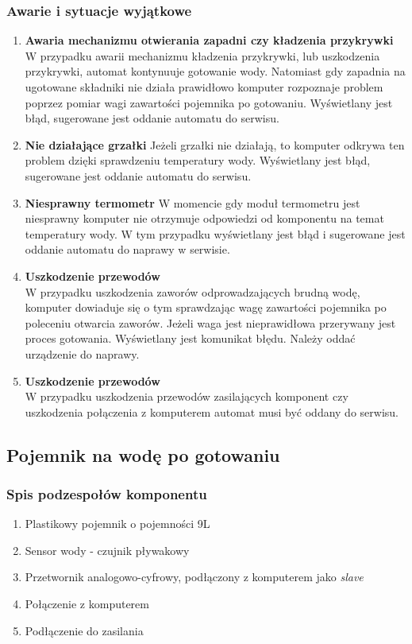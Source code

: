 \documentclass[12pt,a4paper,notitlepage]{article}
\begin{document}
\subsubsection{Awarie i sytuacje wyjątkowe}
\begin{enumerate}
  \item \textbf{Awaria mechanizmu otwierania zapadni czy kładzenia przykrywki}
W przypadku awarii mechanizmu kładzenia przykrywki, lub uszkodzenia przykrywki, automat kontynuuje gotowanie wody. Natomiast gdy zapadnia na ugotowane składniki nie działa prawidłowo komputer rozpoznaje problem poprzez pomiar wagi zawartości pojemnika po gotowaniu. Wyświetlany jest błąd, sugerowane jest oddanie automatu do serwisu.
  \item \textbf{Nie działające grzałki}
Jeżeli grzałki nie działają, to komputer odkrywa ten problem dzięki sprawdzeniu temperatury wody. Wyświetlany jest błąd, sugerowane jest oddanie automatu do serwisu.
  \item \textbf{Niesprawny termometr}
W momencie gdy moduł termometru jest niesprawny komputer nie otrzymuje odpowiedzi od komponentu na temat temperatury wody. W tym przypadku wyświetlany jest błąd i sugerowane jest oddanie automatu do naprawy w serwisie.
  \item \textbf{Uszkodzenie przewodów}\\
W przypadku uszkodzenia zaworów odprowadzających brudną wodę, komputer dowiaduje się o tym sprawdzając wagę zawartości pojemnika po poleceniu otwarcia zaworów. Jeżeli waga jest nieprawidłowa przerywany jest proces gotowania. Wyświetlany jest komunikat błędu. Należy oddać urządzenie do naprawy.
  \item \textbf{Uszkodzenie przewodów}\\
W przypadku uszkodzenia przewodów zasilających komponent czy uszkodzenia połączenia z komputerem automat musi być oddany do serwisu.
\end{enumerate}




\subsection{Pojemnik na wodę po gotowaniu}
\subsubsection{Spis podzespołów komponentu}
\begin{enumerate}
  \item Plastikowy pojemnik o pojemności 9L
  \item Sensor wody - czujnik pływakowy
  \item Przetwornik analogowo-cyfrowy, podłączony z komputerem jako \emph{slave}
  \item Połączenie z komputerem
  \item Podłączenie do zasilania
\end{enumerate}
 
\end{document}
